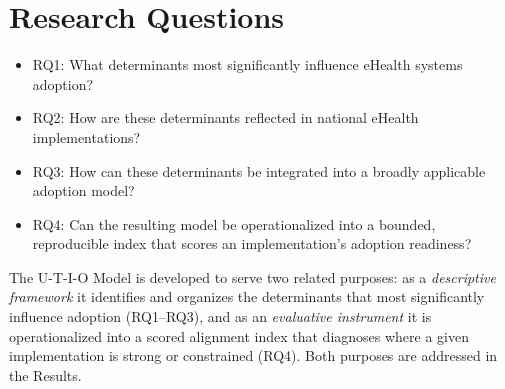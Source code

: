 \section{Research Questions}
\begin{itemize}
\item RQ1: What determinants most significantly influence eHealth systems adoption?
\item RQ2: How are these determinants reflected in national eHealth implementations?
\item RQ3: How can these determinants be integrated into a broadly applicable adoption model?
\item RQ4: Can the resulting model be operationalized into a bounded, reproducible index that scores an implementation's adoption readiness?
\end{itemize}

\noindent The U-T-I-O Model is developed to serve two related purposes: as a \textit{descriptive framework} it identifies and organizes the determinants that most significantly influence adoption (RQ1--RQ3), and as an \textit{evaluative instrument} it is operationalized into a scored alignment index that diagnoses where a given implementation is strong or constrained (RQ4). Both purposes are addressed in the Results.